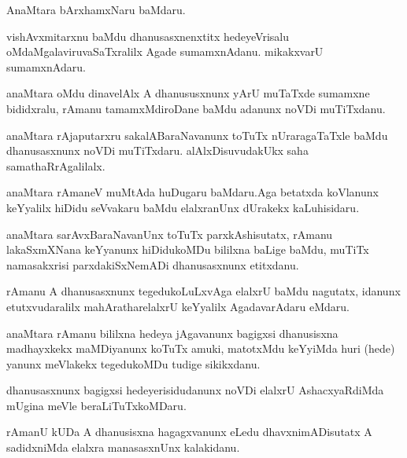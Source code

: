 \documentclass{article}
\begin{document}
\begin{mn}
AnaMtara  bArxhamxNaru  baMdaru.
\end{mn}

\begin{mn}
vishAvxmitarxnu  baMdu  dhanusasxnenxtitx  hedeyeVrisalu  oMdaMgalaviruvaSaTxralilx  Agade  sumamxnAdanu.  mikakxvarU  sumamxnAdaru.
\end{mn}

\begin{mn}
anaMtara  oMdu  dinavelAlx  A  dhanususxnunx  yArU  muTaTxde  sumamxne  bididxralu,  rAmanu  tamamxMdiroDane  baMdu  adanunx  
noVDi  muTiTxdanu.
\end{mn}

\begin{mn}
anaMtara  rAjaputarxru  sakalABaraNavanunx  toTuTx  nUraragaTaTxle  baMdu  dhanusasxnunx  noVDi  muTiTxdaru.  alAlxDisuvudakUkx  
saha  samathaRrAgalilalx.
\end{mn}

\begin{mn}
anaMtara  rAmaneV  muMtAda  huDugaru  baMdaru.Aga  betatxda  koVlanunx  keYyalilx  hiDidu  seVvakaru  baMdu  elalxranUnx  
dUrakekx  kaLuhisidaru.
\end{mn}

\begin{mn}
anaMtara  sarAvxBaraNavanUnx  toTuTx  parxkAshisutatx,  rAmanu  lakaSxmXNana  keYyanunx  hiDidukoMDu  bililxna  baLige  
baMdu,  muTiTx  namasakxrisi  parxdakiSxNemADi  dhanusasxnunx  etitxdanu.
\end{mn}

\begin{mn}
rAmanu  A  dhanusasxnunx  tegedukoLuLxvAga  elalxrU  baMdu  nagutatx,  idanunx  etutxvudaralilx  mahAratharelalxrU  
keYyalilx  AgadavarAdaru  eMdaru.
\end{mn}

\begin{mn}
anaMtara rAmanu  bililxna  hedeya  jAgavanunx  bagigxsi  dhanusisxna  madhayxkekx  maMDiyanunx  koTuTx  amuki,  matotxMdu  
keYyiMda  huri (hede) yanunx  meVlakekx  tegedukoMDu  tudige  sikikxdanu.
\end{mn}

\begin{mn}
dhanusasxnunx  bagigxsi  hedeyerisidudanunx  noVDi  elalxrU  AshacxyaRdiMda  mUgina  meVle  beraLiTuTxkoMDaru.
\end{mn}

\begin{mn}
rAmanU  kUDa  A  dhanusisxna  hagagxvanunx  eLedu  dhavxnimADisutatx  A  sadidxniMda  elalxra  manasasxnUnx  kalakidanu.
\end{mn}
\end{document}
